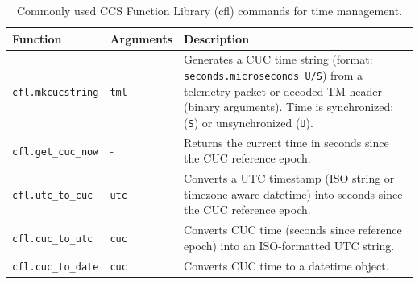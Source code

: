 \begin{table}[h!]
\centering
\renewcommand{\arraystretch}{1.3}
\setlength{\tabcolsep}{8pt}
\begin{tabular}{p{4cm} p{5cm} p{6cm}}
\hline
\textbf{Function} & \textbf{Arguments} & \textbf{Description} \\ 
\hline

\texttt{cfl.mkcucstring} & \texttt{tml} & Generates a CUC time string (format: \texttt{seconds.microseconds U/S}) from a telemetry packet or decoded TM header (binary arguments). Time is synchronized: (\texttt{S}) or unsynchronized (\texttt{U}). \\

\texttt{cfl.get\_cuc\_now} & - & Returns the current time in seconds since the CUC reference epoch. \\

\texttt{cfl.utc\_to\_cuc} & \texttt{utc} & Converts a UTC timestamp (ISO string or timezone-aware datetime) into seconds since the CUC reference epoch. \\

\texttt{cfl.cuc\_to\_utc} & \texttt{cuc} & Converts CUC time (seconds since reference epoch) into an ISO-formatted UTC string. \\

\texttt{cfl.cuc\_to\_date} & \texttt{cuc} & Converts CUC time to a datetime object. \\
\hline
\end{tabular}
\caption{Commonly used CCS Function Library (cfl) commands for time management.}
\end{table}






